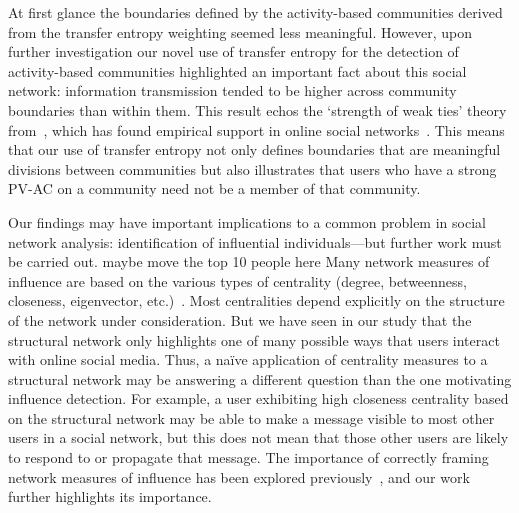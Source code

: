 

At first glance the boundaries defined by the activity-based communities derived from the transfer entropy weighting seemed less meaningful. However, upon further investigation our novel use of transfer entropy for the detection of activity-based communities highlighted an important fact about this social network: information transmission tended to be higher across community boundaries than within them. This result echos the `strength of weak ties' theory from~\cite{granovetter1973strength}, which has found empirical support in online social networks~\cite{grabowicz2012social}. This means that our use of transfer entropy not only defines boundaries that are meaningful divisions between communities but also illustrates that users who have a strong PV-AC on a community need not be a member of that community. 


Our findings may have important implications to a common problem in social network analysis: identification of influential individuals---but further work must be carried out.
\alert{maybe move the top 10 people here}
 Many network measures of influence are based on the various types of centrality (degree, betweenness, closeness, eigenvector, etc.)~\cite{newman2009networks}. Most centralities depend explicitly on the structure of the network under consideration. But we have seen in our study that the structural network only highlights one of many possible ways that users interact with online social media.
Thus, a na\"ive application of centrality measures to a structural network may be answering a different question than the one motivating influence detection. For example, a user exhibiting high closeness centrality based on the structural network may be able to make a message visible to most other users in a social network, but this does not mean that those other users are likely to respond to or propagate that message. The importance of correctly framing network measures of influence has been explored previously~\cite{kitsak2010identification}, and our work further highlights its importance. 

